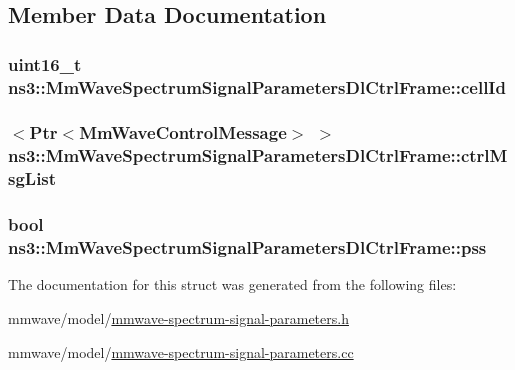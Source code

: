 \subsection{Member Data Documentation}
\subsubsection[{\texorpdfstring{cell\+Id}{cellId}}]{\setlength{\rightskip}{0pt plus 5cm}uint16\+\_\+t ns3\+::\+Mm\+Wave\+Spectrum\+Signal\+Parameters\+Dl\+Ctrl\+Frame\+::cell\+Id}\hypertarget{structns3_1_1MmWaveSpectrumSignalParametersDlCtrlFrame_a565935ef9bab70d515ac59dc44040e61}{}\label{structns3_1_1MmWaveSpectrumSignalParametersDlCtrlFrame_a565935ef9bab70d515ac59dc44040e61}
\subsubsection[{\texorpdfstring{ctrl\+Msg\+List}{ctrlMsgList}}]{$<${\bf Ptr}$<${\bf Mm\+Wave\+Control\+Message}$>$ $>$ ns3\+::\+Mm\+Wave\+Spectrum\+Signal\+Parameters\+Dl\+Ctrl\+Frame\+::ctrl\+Msg\+List}\hypertarget{structns3_1_1MmWaveSpectrumSignalParametersDlCtrlFrame_a72bb3769769db04039d2d6c1c1678981}{}\label{structns3_1_1MmWaveSpectrumSignalParametersDlCtrlFrame_a72bb3769769db04039d2d6c1c1678981}
\subsubsection[{\texorpdfstring{pss}{pss}}]{\setlength{\rightskip}{0pt plus 5cm}bool ns3\+::\+Mm\+Wave\+Spectrum\+Signal\+Parameters\+Dl\+Ctrl\+Frame\+::pss}\hypertarget{structns3_1_1MmWaveSpectrumSignalParametersDlCtrlFrame_aa872e6e319b00f95c2d5add1b5576bf2}{}\label{structns3_1_1MmWaveSpectrumSignalParametersDlCtrlFrame_aa872e6e319b00f95c2d5add1b5576bf2}


The documentation for this struct was generated from the following files\+:\begin{DoxyCompactItemize}
\item 
mmwave/model/\hyperlink{mmwave-spectrum-signal-parameters_8h}{mmwave-\/spectrum-\/signal-\/parameters.\+h}\item 
mmwave/model/\hyperlink{mmwave-spectrum-signal-parameters_8cc}{mmwave-\/spectrum-\/signal-\/parameters.\+cc}\end{DoxyCompactItemize}
